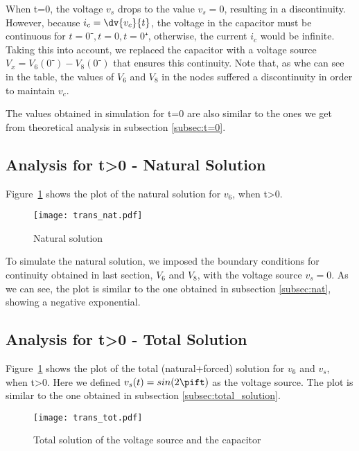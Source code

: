 When t=0, the voltage $v_s$ drops to the value $v_s=0$, resulting in a discontinuity. However, because $i_c=\dv{v_c}{t}$, the voltage in the capacitor must be continuous for $t=0⁻, t=0, t=0⁺$, otherwise, the current $i_c$ would be infinite. Taking this into account, we replaced the capacitor with a voltage source $V_x=V_6(0⁻)-V_8(0⁻)$ that ensures this continuity. Note that, as whe can see in the table, the values of $V_6$ and $V_8$ in the nodes suffered a discontinuity in order to maintain $v_c$. 

The values obtained in simulation for t=0 are also similar to the ones we get from theoretical analysis in subsection \ref{subsec:t=0}.

\subsection{Analysis for t>0 - Natural Solution}

\par Figure~\ref{fig:trans_nat} shows the plot of the natural solution for $v_6$, when t>0.

\begin{figure}[h] \centering
\texttt{[image: trans\_nat.pdf]}
\caption{Natural solution}
\label{fig:trans_nat}
\end{figure}

To simulate the natural solution, we imposed the boundary conditions for continuity obtained in last section, $V_6$ and $V_8$, with the voltage source $v_s=0$. As we can see, the plot is similar to the one obtained in subsection \ref{subsec:nat}, showing a negative exponential.

\subsection{Analysis for t>0 - Total Solution}

\par Figure~\ref{fig:trans_nat} shows the plot of the total (natural+forced) solution for $v_6$ and $v_s$, when t>0. Here we defined $v_s(t)=sin(2\pift)$ as the voltage source. The plot is similar to the one obtained in subsection \ref{subsec:total_solution}.

\begin{figure}[h] \centering
\texttt{[image: trans\_tot.pdf]}
\caption{Total solution of the voltage source and the capacitor}
\label{fig:trans_tot}
\end{figure}


